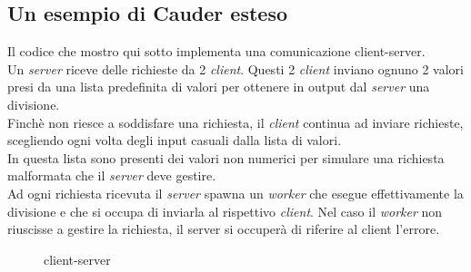 \documentclass[Contributo.tex]{subfiles}
\begin{document}
\subsection{Un esempio di Cauder esteso}
Il codice che mostro qui sotto implementa una comunicazione client-server.\\
Un \textit{server} riceve delle richieste da 2 \textit{client}. Questi 2 \textit{client} inviano ognuno 2 valori presi da una lista predefinita di valori per ottenere in output dal \textit{server} una divisione.\\
Finchè non riesce a soddisfare una richiesta, il \textit{client} continua ad inviare richieste, scegliendo ogni volta degli input casuali dalla lista di valori.\\
In questa lista sono presenti dei valori non numerici per simulare una richiesta malformata che il \textit{server} deve gestire.\\
Ad ogni richiesta ricevuta il \textit{server} spawna un \textit{worker} che esegue effettivamente la divisione e che si occupa di inviarla al rispettivo \textit{client}.
Nel caso il \textit{worker} non riuscisse a gestire la richiesta, il server si occuperà di riferire al client l'errore.
\begin{figure}[H]

\caption{client-server}
\label{example}
\end{figure}
\end{document}
